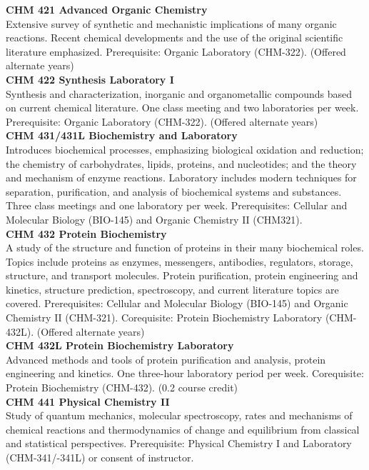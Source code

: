 \documentclass[
  letterpaper,
]{scrbook}
\begin{document}
\textbf{CHM 421 Advanced Organic Chemistry}\\
Extensive survey of synthetic and mechanistic implications of many
organic reactions. Recent chemical developments and the use of the
original scientific literature emphasized. Prerequisite: Organic
Laboratory (CHM-322). (Offered alternate years)\\
\textbf{CHM 422 Synthesis Laboratory I}\\
Synthesis and characterization, inorganic and organometallic compounds
based on current chemical literature. One class meeting and two
laboratories per week. Prerequisite: Organic Laboratory (CHM-322).
(Offered alternate years)\\
\textbf{CHM 431/431L Biochemistry and Laboratory}\\
Introduces biochemical processes, emphasizing biological oxidation and
reduction; the chemistry of carbohydrates, lipids, proteins, and
nucleotides; and the theory and mechanism of enzyme reactions.
Laboratory includes modern techniques for separation, purification, and
analysis of biochemical systems and substances. Three class meetings and
one laboratory per week. Prerequisites: Cellular and Molecular Biology
(BIO-145) and Organic Chemistry II (CHM321).\\
\textbf{CHM 432 Protein Biochemistry}\\
A study of the structure and function of proteins in their many
biochemical roles. Topics include proteins as enzymes, messengers,
antibodies, regulators, storage, structure, and transport molecules.
Protein purification, protein engineering and kinetics, structure
prediction, spectroscopy, and current literature topics are covered.
Prerequisites: Cellular and Molecular Biology (BIO-145) and Organic
Chemistry II (CHM-321). Corequisite: Protein Biochemistry Laboratory
(CHM-432L). (Offered alternate years)\\
\textbf{CHM 432L Protein Biochemistry Laboratory}\\
Advanced methods and tools of protein purification and analysis, protein
engineering and kinetics. One three-hour laboratory period per week.
Corequisite: Protein Biochemistry (CHM-432). (0.2 course credit)\\
\textbf{CHM 441 Physical Chemistry II}\\
Study of quantum mechanics, molecular spectroscopy, rates and mechanisms
of chemical reactions and thermodynamics of change and equilibrium from
classical and statistical perspectives. Prerequisite: Physical Chemistry
I and Laboratory (CHM-341/-341L) or consent of instructor.\\
\end{document}
